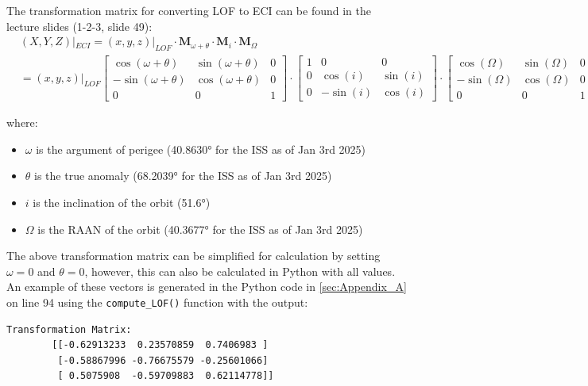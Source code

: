 \begin{itemize}
    The transformation matrix for converting LOF to ECI can be found in the lecture slides (1-2-3, slide 49):
    \tiny
    \begin{equation}
    \label{eq:LOF-ECI_transformation_matrix}
    \begin{split}
        &(X, Y, Z)|_{ECI} = (x, y, z)|_{LOF} \cdot \textbf{M}_{\omega + \theta} \cdot \mathbf{M}_{i} \cdot \mathbf{M}_{\Omega} \\
        &= (x, y, z)|_{LOF}
        \begin{bmatrix}
            \cos(\omega + \theta) & \sin(\omega + \theta) & 0 \\
            -\sin(\omega + \theta) & \cos(\omega + \theta) & 0 \\
            0 & 0 & 1
        \end{bmatrix}
        \cdot
        \begin{bmatrix}
            1 & 0 & 0 \\
            0 & \cos(i) & \sin(i) \\
            0 & -\sin(i) & \cos(i)
        \end{bmatrix}
        \cdot
        \begin{bmatrix}
            \cos(\Omega) & \sin(\Omega) & 0 \\
            -\sin(\Omega) & \cos(\Omega) & 0 \\
            0 & 0 & 1
        \end{bmatrix}
    \end{split}
    \end{equation}
    \normalsize

    where:
    \begin{itemize}
       \item $\omega$ is the argument of perigee (40.8630° for the ISS as of Jan 3rd 2025) \cite{ISS_orbit_parameters} 
       \item $\theta$ is the true anomaly (68.2039° for the ISS as of Jan 3rd 2025)   \cite{ISS_orbit_parameters}      
       \item $i$ is the inclination of the orbit (51.6°)
       \item $\Omega$ is the RAAN of the orbit (40.3677° for the ISS as of Jan 3rd 2025) \cite{ISS_orbit_parameters}
    \end{itemize}

    The above transformation matrix can be simplified for calculation by setting $\omega = 0$ and $\theta = 0$, however, this can also be calculated in Python with all values. 
    An example of these vectors is generated in the Python code in \autoref{sec:Appendix_A} on line 94 using the \verb|compute_LOF()| function with the output:
    \begin{lstlisting}[frame=single]
        Transformation Matrix:        
        [[-0.62913233  0.23570859  0.7406983 ]
         [-0.58867996 -0.76675579 -0.25601066]
         [ 0.5075908  -0.59709883  0.62114778]]
        

\end{lstlisting}
\end{itemize}
